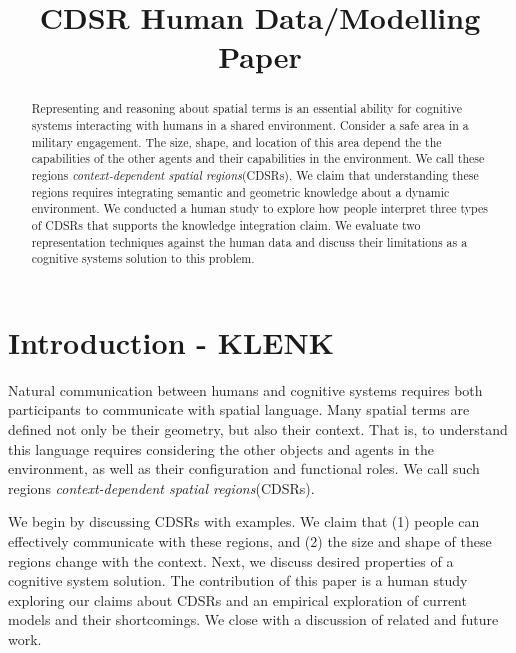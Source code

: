 \documentclass[11pt,letterpaper]{article}
\begin{document}
 

\title{CDSR Human Data/Modelling Paper}
 
\vskip 0.2in
 
\begin{abstract}
Representing and reasoning about spatial terms is an essential ability for cognitive systems interacting with humans in a shared environment.  Consider a safe area in a military engagement.  The size, shape, and location of this area depend the the capabilities of the other agents and their capabilities in the environment.  We call these regions \textit{context-dependent spatial regions}(CDSRs).  We claim that understanding these regions requires integrating semantic and geometric knowledge about a dynamic environment.  We conducted a human study to explore how people interpret three types of CDSRs that supports the knowledge integration claim.  We evaluate two representation techniques against the human data and discuss their limitations as a cognitive systems solution to this problem.
\end{abstract}

\section{Introduction - KLENK} 
Natural communication between humans and cognitive systems requires both participants to communicate with spatial language.  Many spatial terms are defined not only be their geometry, but also their context.  That is, to understand this language requires considering the other objects and agents in the environment, as well as their configuration and functional roles.  We call such regions \textit{context-dependent spatial regions}(CDSRs).

We begin by discussing CDSRs with examples.  We claim that (1) people can effectively communicate with these regions, and (2) the size and shape of these regions change with the context.  Next, we discuss desired properties of a cognitive system solution.  The contribution of this paper is a human study exploring our claims about CDSRs and an empirical exploration of current models and their shortcomings.  We close with a discussion of related and future work. 
\end{document}
